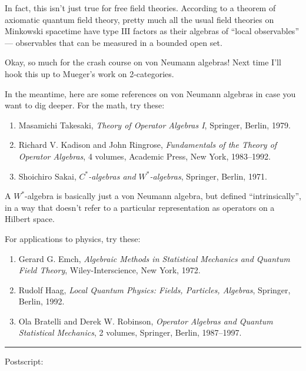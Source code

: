 \documentclass{article}
\begin{document}
In fact, this isn't just true for free field theories. According to a
theorem of axiomatic quantum field theory, pretty much all the usual
field theories on Minkowski spacetime have type \(\mathrm{III}\) factors
as their algebras of ``local observables'' --- observables that can be
measured in a bounded open set.

Okay, so much for the crash course on von Neumann algebras! Next time
I'll hook this up to Mueger's work on 2-categories.

In the meantime, here are some references on von Neumann algebras in
case you want to dig deeper. For the math, try these:

\begin{enumerate}
\def\labelenumi{\arabic{enumi})}
\setcounter{enumi}{4}
\item
  Masamichi Takesaki, \emph{Theory of Operator Algebras I}, Springer,
  Berlin, 1979.
\item
  Richard V. Kadison and John Ringrose, \emph{Fundamentals of the Theory
  of Operator Algebras}, 4 volumes, Academic Press, New York,
  1983--1992.
\item
  Shoichiro Sakai, \emph{\(C^*\)-algebras and \(W^*\)-algebras},
  Springer, Berlin, 1971.
\end{enumerate}

A \(W^*\)-algebra is basically just a von Neumann algebra, but defined
``intrinsically'', in a way that doesn't refer to a particular
representation as operators on a Hilbert space.

For applications to physics, try these:

\begin{enumerate}
\def\labelenumi{\arabic{enumi})}
\setcounter{enumi}{7}
\item
  Gerard G. Emch, \emph{Algebraic Methods in Statistical Mechanics and
  Quantum Field Theory}, Wiley-Interscience, New York, 1972.
\item
  Rudolf Haag, \emph{Local Quantum Physics: Fields, Particles,
  Algebras}, Springer, Berlin, 1992.
\item
  Ola Bratelli and Derek W. Robinson, \emph{Operator Algebras and
  Quantum Statistical Mechanics}, 2 volumes, Springer, Berlin,
  1987--1997.
\end{enumerate}

\begin{center}\rule{0.5\linewidth}{0.5pt}\end{center}

Postscript:
\end{document}
